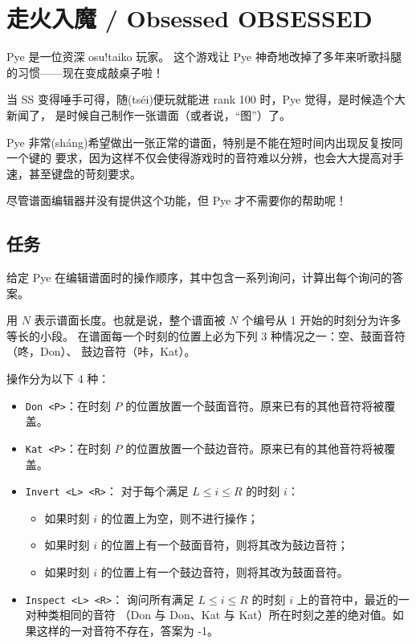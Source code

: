 \documentclass[UTF8, 11pt, a4paper]{article}
\begin{document}
\section*{走火入魔 / Obsessed \makebox[2.5em]{} \small{OBSESSED}}
Pye 是一位资深 osu!taiko 玩家。%
这个游戏让 Pye 神奇地改掉了多年来听歌抖腿的习惯——现在变成敲桌子啦！

当 SS 变得唾手可得，随(tséi)便玩就能进 rank 100 时，Pye 觉得，是时候造个大新闻了，%
是时候自己制作一张谱面（或者说，“图”）了。

Pye 非常(sháng)希望做出一张正常的谱面，特别是不能在短时间内出现反复按同一个键的%
要求，因为这样不仅会使得游戏时的音符难以分辨，也会大大提高对手速，甚至键盘的苛刻要求。

尽管谱面编辑器并没有提供这个功能，但 Pye 才不需要你的帮助呢！

\subsection*{任务}
给定 Pye 在编辑谱面时的操作顺序，其中包含一系列询问，计算出每个询问的答案。

用 $N$ 表示谱面长度。也就是说，整个谱面被 $N$ 个编号从 1 开始的时刻分为许多等长的小段。%
在谱面每一个时刻的位置上必为下列 3 种情况之一：空、鼓面音符（咚，Don）、%
鼓边音符（咔，Kat）。

操作分为以下 4 种：
\begin{itemize}
    \item \texttt{Don <P>}：在时刻 $P$ 的位置放置一个鼓面音符。原来已有的其他音符将被覆盖。
    \item \texttt{Kat <P>}：在时刻 $P$ 的位置放置一个鼓边音符。原来已有的其他音符将被覆盖。
    \item \texttt{Invert <L> <R>}：%
        对于每个满足 $L \leq i \leq R$ 的时刻 $i$：
        \begin{itemize}
            \item 如果时刻 $i$ 的位置上为空，则不进行操作；
            \item 如果时刻 $i$ 的位置上有一个鼓面音符，则将其改为鼓边音符；
            \item 如果时刻 $i$ 的位置上有一个鼓边音符，则将其改为鼓面音符。
        \end{itemize}
    \item \texttt{Inspect <L> <R>}：%
        询问所有满足 $L \leq i \leq R$ 的时刻 $i$ 上的音符中，最近的一对种类相同的音符%
        （Don 与 Don、Kat 与 Kat）所在时刻之差的绝对值。如果这样的一对音符不存在，答案为 -1。
\end{itemize}
\end{document}
